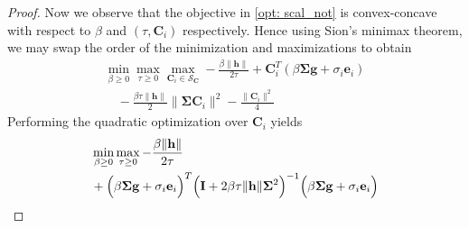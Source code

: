 \documentclass[10pt,a4paper]{amsart}
\newcommand{\bC}{\mathbf{C}}
\newcommand{\calS}{\mathcal{S}}
\begin{document}
\begin{proof}
Now we observe that the objective in \eqref{opt: scal_not} is convex-concave with respect to $\beta$ and $(\tau, \bC_i)$ respectively. Hence using Sion's minimax theorem, we may swap the order of the minimization and maximizations to obtain
\begin{align*}
    \min_{\beta \ge 0} \max_{\tau \ge 0} \max_{\mathbf{C}_i \in \calS_{\bC}}  - \frac{\beta\|\mathbf{h}\|}{2\tau} + \mathbf{C}_i^T \left(\beta \boldsymbol{\Sigma} \mathbf{g} + \sigma_i\mathbf{e}_i\right) \\
    \quad - \frac{\beta\tau  \|\mathbf{h}\|}{2} \|\boldsymbol{\Sigma}\mathbf{C}_i\|^2 - \frac{\|\mathbf{C}_i\|^2}{4}
\end{align*}
Performing the quadratic optimization over $\bC_i$ yields
\begin{align}\label{eq: obj_before_HW}
& \min_{\beta \ge 0} \max_{\tau \ge 0}  - \frac{\beta\|\mathbf{h}\|}{2\tau} \nonumber \\ 
& + \Bigl(\beta \boldsymbol{\Sigma} \mathbf{g} + \sigma_i\mathbf{e}_i\Bigr)^T\Bigl(\mathbf{I} + 2 \beta\tau \|\mathbf{h}\|\boldsymbol{\Sigma}^2\Bigr)^{-1} \Bigl(\beta \boldsymbol{\Sigma} \mathbf{g} + \sigma_i\mathbf{e}_i\Bigr) 
\end{align}




\end{proof}
\end{document}
